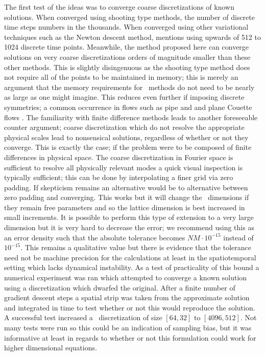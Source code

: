 The first test of the ideas was to converge coarse discretizations
of known solutions. When converged using shooting type methods, the
number of discrete time steps numbers in the thousands. When converged
using other variational techniques such as the Newton descent method, 
mentions using upwards of 512 to 1024 discrete time points. Meanwhile, the method
proposed here can converge solutions on very coarse discretizations orders of magnitude smaller
than these other methods. This is slightly disingenuous as the shooting type method does
not require all of the points to be maintained in memory; this is merely an
argument that the memory requirements for \spt\ methods do not need to be nearly
as large as one might imagine. This reduces even further if imposing discrete symmetries;
a common occurrence in flows such as pipe and and plane Couette flows .
The familiarity with finite difference methods leads to another foreseeable counter argument;
coarse discretization which do not resolve the appropriate physical scales lead to nonsensical
solutions, regardless of whether or not they converge. This is exactly the case; if the problem
were to be composed of finite differences in physical space. The coarse discretization in
Fourier space is sufficient to resolve all physically relevant modes a quick visual inspection is
typically sufficient; this can be done by interpolating a finer grid via zero padding.
If skepticism remains an alternative would be to alternative between zero padding and converging.
This works but it will change the \spt\ dimensions if they remain free parameters and so
the lattice dimension is best increased in small increments. It is possible to perform
this type of extension to a very large dimension but it is very hard to decrease the error;
we recommend using this as an error density such that the absolute tolerance becomes
$NM \cdot 10^{-15}$ instead of $10^{-15}$. This remains a qualitative value but there
is evidence that the tolerance need not be machine precision for the calculations at least
in the spatiotemporal setting which lacks dynamical instability. As a test of practicality of
this bound a numerical experiment was ran which attempted to converge a known solution using
a discretization which dwarfed the original. After a finite number of gradient descent steps
a spatial strip was taken from the approximate solution and integrated in time to test whether
or not this would reproduce the solution. A successful test increased a \spt\ discretization
of size $[64, 32]$ to $[4096, 512]$. Not many tests were run so this could be an indication
of sampling bias, but it was informative at least in regards to whether or not this formulation
could work for higher dimensional equations.

